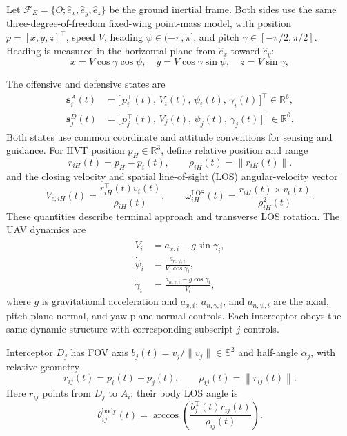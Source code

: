 \documentclass{cja}
\begin{document}
Let $\mathcal{F}_E=\{O;\hat{e}_x,\hat{e}_y,\hat{e}_z\}$ be the ground inertial frame. Both sides use the same three-degree-of-freedom fixed-wing point-mass model, with position $p=[x,y,z]^\top$, speed $V$, heading $\psi\in(-\pi,\pi]$, and pitch $\gamma\in[-\pi/2,\pi/2]$. Heading is measured in the horizontal plane from $\hat e_x$ toward $\hat e_y$:
\begin{equation}
\dot x = V\cos\gamma\cos\psi,\quad
\dot y = V\cos\gamma\sin\psi,\quad
\dot z = V\sin\gamma,
\label{eq:vel-decomp}
\end{equation}

The offensive and defensive states are
\begin{align}
\mathbf s_i^{A}(t)&=\bigl[\,p_i^\top(t),\,V_i(t),\,\psi_i(t),\,\gamma_i(t)\,\bigr]^\top\in\mathbb{R}^{6},
\label{eq:att-state}\\
\mathbf s_j^{D}(t)&=\bigl[\,p_j^\top(t),\,V_j(t),\,\psi_j(t),\,\gamma_j(t)\,\bigr]^\top\in\mathbb{R}^{6}.
\label{eq:def-state}
\end{align}
Both states use common coordinate and attitude conventions for sensing and guidance.
For HVT position $p_H\in\mathbb{R}^3$, define relative position and range
\begin{equation}
r_{iH}(t)=p_H-p_i(t),\qquad
\rho_{iH}(t)=\|r_{iH}(t)\|.
\label{eq:riH-def}
\end{equation}
and the closing velocity and spatial line-of-sight (LOS) angular-velocity vector
\begin{equation}
V_{c,iH}(t)=\frac{r_{iH}^{\top}(t)v_i(t)}{\rho_{iH}(t)},\qquad
\omega_{iH}^{\mathrm{LOS}}(t)=\frac{r_{iH}(t)\times v_i(t)}{\rho_{iH}^2(t)}.
\label{eq:hvt_kinematics_def}
\end{equation}
These quantities describe terminal approach and transverse LOS rotation. The UAV dynamics are
\begin{align}
\dot V_i&=a_{x,i}-g\sin\gamma_i,
\label{eq:dyn-V}\\
\dot\psi_i&=\frac{a_{n,\psi,i}}{V_i\cos\gamma_i},
\label{eq:dyn-psi}\\
\dot\gamma_i&=\frac{a_{n,\gamma,i}-g\cos\gamma_i}{V_i},
\label{eq:dyn-gamma}
\end{align}
where $g$ is gravitational acceleration and $a_{x,i}$, $a_{n,\gamma,i}$, and $a_{n,\psi,i}$ are the axial, pitch-plane normal, and yaw-plane normal controls. Each interceptor obeys the same dynamic structure with corresponding subscript-$j$ controls.

Interceptor $D_j$ has FOV axis $b_j(t)=v_j/\|v_j\|\in\mathbb S^2$ and half-angle $\alpha_j$, with relative geometry
\begin{equation}
r_{ij}(t)=p_i(t)-p_j(t),\qquad
\rho_{ij}(t)=\left\|r_{ij}(t)\right\|.
\end{equation}
Here $r_{ij}$ points from $D_j$ to $A_i$; their body LOS angle is
\begin{equation}
\theta_{ij}^{\mathrm{body}}(t)
=
\arccos
\left(
\frac{b_j^{\mathrm T}(t)r_{ij}(t)}
{\rho_{ij}(t)}
\right).
\end{equation}
\end{document}
